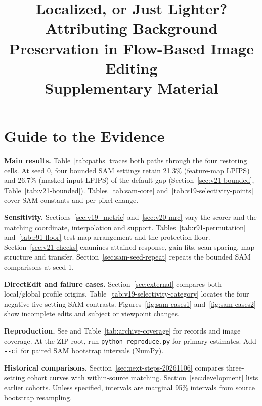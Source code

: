 \documentclass[10pt,doubleanonymous]{ieeeconf}
\title{Localized, or Just Lighter? Attributing Background Preservation in Flow-Based Image Editing\texorpdfstring{\\}{: }Supplementary Material}
\begin{document}
\raggedbottom
\maketitle


\section{Guide to the Evidence}
\label{sec:evidence-guide}
\noindent\textbf{Main results.} Table~\ref{tab:paths} traces both paths through the four restoring cells. At seed 0, four bounded SAM settings retain 21.3\% (feature-map LPIPS) and 26.7\% (masked-input LPIPS) of the default gap (Section~\ref{sec:v21-bounded}, Table~\ref{tab:v21-bounded}). Tables~\ref{tab:sam-core} and~\ref{tab:v19-selectivity-points} cover SAM constants and per-pixel change.

\noindent\textbf{Sensitivity.} Sections~\ref{sec:v19_metric} and~\ref{sec:v20-mrc} vary the scorer and the matching coordinate, interpolation and support. Tables~\ref{tab:r91-permutation} and~\ref{tab:r91-floor} test map arrangement and the protection floor. Section~\ref{sec:v21-checks} examines attained response, gain fits, scan spacing, map structure and transfer. Section~\ref{sec:sam-seed-repeat} repeats the bounded SAM comparisons at seed 1.

\noindent\textbf{DirectEdit and failure cases.} Section~\ref{sec:external} compares both local/global profile origins. Table~\ref{tab:v19-selectivity-category} locates the four negative five-setting SAM contrasts. Figures~\ref{fig:sam-cases1} and~\ref{fig:sam-cases2} show incomplete edits and subject or viewpoint changes.

\noindent\textbf{Reproduction.} See  and Table~\ref{tab:archive-coverage} for records and image coverage. At the ZIP root, run \texttt{python reproduce.py} for primary estimates. Add \mbox{\texttt{-\kern0pt-ci}} for paired SAM bootstrap intervals (NumPy).

\noindent\textbf{Historical comparisons.} Section~\ref{sec:next-steps-20261106} compares three-setting cohort curves with within-source matching. Section~\ref{sec:development} lists earlier cohorts. Unless specified, intervals are marginal 95\% intervals from source bootstrap resampling.
\end{document}
